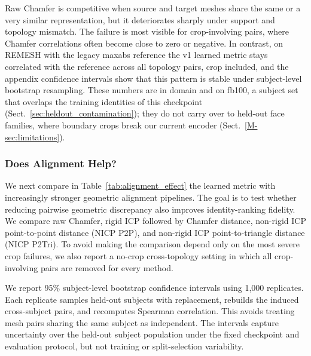 Raw Chamfer is competitive when source and target meshes share the same or a very similar representation, but it deteriorates sharply under support and topology mismatch. The failure is most visible for crop-involving pairs, where Chamfer correlations often become close to zero or negative. In contrast, on REMESH with the legacy maxabs reference the v1 learned metric stays correlated with the reference across all topology pairs, crop included, and the appendix confidence intervals show that this pattern is stable under subject-level bootstrap resampling. These numbers are in domain and on fb100, a subject set that overlaps the training identities of this checkpoint (Sect.~\ref{sec:heldout_contamination}); they do not carry over to held-out face families, where boundary crops break our current encoder (Sect.~\ref{M-sec:limitations}).

\subsubsection{Does Alignment Help?}
\label{sec:alignment_results}

We next compare in Table~\ref{tab:alignment_effect} the learned metric with increasingly stronger geometric alignment pipelines. The goal is to test whether reducing pairwise geometric discrepancy also improves identity-ranking fidelity. We compare raw Chamfer, rigid ICP followed by Chamfer distance, non-rigid ICP point-to-point distance (NICP P2P), and non-rigid ICP point-to-triangle distance (NICP P2Tri). To avoid making the comparison depend only on the most severe crop failures, we also report a no-crop cross-topology setting in which all crop-involving pairs are removed for every method.

We report 95\% subject-level bootstrap confidence intervals using 1,000
replicates. Each replicate samples held-out subjects with replacement, rebuilds
the induced cross-subject pairs, and recomputes Spearman correlation. This avoids
treating mesh pairs sharing the same subject as independent. The intervals
capture uncertainty over the held-out subject population under the fixed
checkpoint and evaluation protocol, but not training or split-selection
variability.

